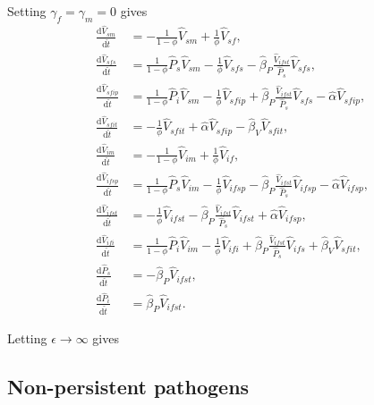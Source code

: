 \documentclass{article}
\newcommand{\md}{\mathrm{d}}
\begin{document}
Setting $\gamma_f = \gamma_m = 0$ gives
\begin{equation}
  \begin{split}
    \frac{\md \hat{V}_{sm}}{\md \hat{t}}
    &=
    - \frac{1}{1 - \phi} \hat{V}_{sm}
    + \frac{1}{\phi} \hat{V}_{sf},
    \\
    \frac{\md \hat{V}_{sfs}}{\md \hat{t}}
    &=
    \frac{1}{1 - \phi} \hat{P}_s \hat{V}_{sm}
    - \frac{1}{\phi} \hat{V}_{sfs}
    - \hat{\beta}_P \frac{\hat{V}_{ifst}}{\hat{P}_s} \hat{V}_{sfs},
    \\
    \frac{\md \hat{V}_{sfip}}{\md \hat{t}}
    &=
    \frac{1}{1 - \phi} \hat{P}_i \hat{V}_{sm}
    - \frac{1}{\phi} \hat{V}_{sfip}
    + \hat{\beta}_P \frac{\hat{V}_{ifst}}{\hat{P}_s} \hat{V}_{sfs}
    - \hat{\alpha} \hat{V}_{sfip},
    \\
    \frac{\md \hat{V}_{sfit}}{\md \hat{t}}
    &=
    - \frac{1}{\phi} \hat{V}_{sfit}
    + \hat{\alpha} \hat{V}_{sfip}
    - \hat{\beta}_V \hat{V}_{sfit},
    \\
    \frac{\md \hat{V}_{im}}{\md \hat{t}}
    &=
    - \frac{1}{1 - \phi} \hat{V}_{im}
    + \frac{1}{\phi} \hat{V}_{if},
    \\
    \frac{\md \hat{V}_{ifsp}}{\md \hat{t}}
    &=
    \frac{1}{1 - \phi} \hat{P}_s \hat{V}_{im}
    - \frac{1}{\phi} \hat{V}_{ifsp}
    - \hat{\beta}_P \frac{\hat{V}_{ifst}}{\hat{P}_s} \hat{V}_{ifsp}
    - \hat{\alpha} \hat{V}_{ifsp},
    \\
    \frac{\md \hat{V}_{ifst}}{\md \hat{t}}
    &=
    - \frac{1}{\phi} \hat{V}_{ifst}
    - \hat{\beta}_P \frac{\hat{V}_{ifst}}{\hat{P}_s} \hat{V}_{ifst}
    + \hat{\alpha} \hat{V}_{ifsp},
    \\
    \frac{\md \hat{V}_{ifi}}{\md \hat{t}}
    &=
    \frac{1}{1 - \phi} \hat{P}_i \hat{V}_{im}
    - \frac{1}{\phi} \hat{V}_{ifi}
    + \hat{\beta}_P \frac{\hat{V}_{ifst}}{\hat{P}_s} \hat{V}_{ifs}
    + \hat{\beta}_V \hat{V}_{sfit},
    \\
    \frac{\md \hat{P}_s}{\md \hat{t}}
    &=
    - \hat{\beta}_P \hat{V}_{ifst},
    \\
    \frac{\md \hat{P}_i}{\md \hat{t}}
    &=
    \hat{\beta}_P \hat{V}_{ifst}.
  \end{split}
\end{equation}

Letting $\epsilon \to \infty$ gives


\subsection{Non-persistent pathogens}
\end{document}
